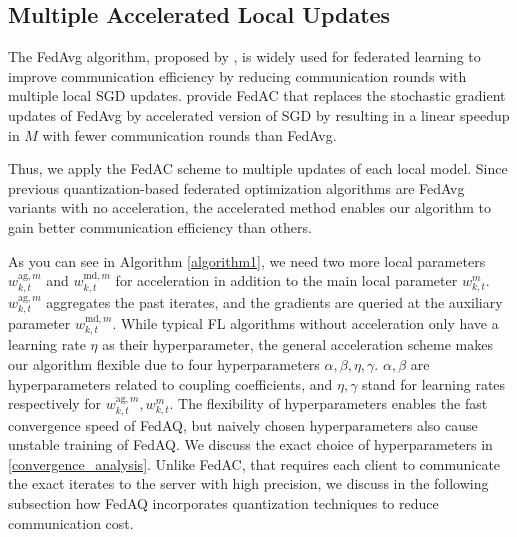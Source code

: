 \documentclass[11pt]{article}
\begin{document}
\subsection{Multiple Accelerated Local Updates}

The FedAvg algorithm, proposed by \cite{Yeojoon-mcmahan2017communication}, is widely used for federated learning to improve communication efficiency by reducing communication rounds with multiple local SGD updates. \cite{Yeojoon-yuan2020federated} provide FedAC that replaces the stochastic gradient updates of FedAvg by accelerated version of SGD by \cite{Yeojoon-ghadimi2012optimal} resulting in a linear speedup in $M$ with fewer communication rounds than FedAvg.

Thus, we apply the FedAC scheme to multiple updates of each local model. Since previous quantization-based federated optimization algorithms are FedAvg variants with no acceleration, the accelerated method enables our algorithm to gain better communication efficiency than others.

As you can see in Algorithm \ref{algorithm1}, we need two more local parameters $w_{k, t}^{\textrm{ag}, m}$ and $w_{k, t}^{\textrm{md}, m}$ for acceleration in addition to the main local parameter $w_{k, t}^m$. $w_{k,t}^{\textrm{ag},m}$ aggregates the past iterates, and the gradients are queried at the auxiliary parameter $w_{k,t}^{\textrm{md},m}$. While typical FL algorithms without acceleration only have a learning rate $\eta$ as their hyperparameter, the general acceleration scheme makes our algorithm flexible due to four hyperparameters $\alpha, \beta, \eta, \gamma$. $\alpha, \beta$ are hyperparameters related to coupling coefficients, and $\eta, \gamma$ stand for learning rates respectively for $w_{k, t}^{\textrm{ag}, m}, w_{k, t}^m$. The flexibility of hyperparameters enables the fast convergence speed of FedAQ, but naively chosen hyperparameters also cause unstable training of FedAQ. We discuss the exact choice of hyperparameters in \cref{convergence_analysis}. Unlike FedAC, that requires each client to communicate the exact iterates to the server with high precision, we discuss in the following subsection how FedAQ incorporates quantization techniques to reduce communication cost.
\end{document}

